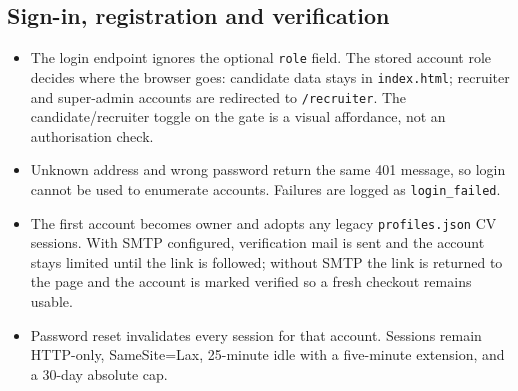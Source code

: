 \documentclass[11pt,a4paper]{article}
\newcommand{\file}[1]{\texttt{\small #1}}
\newcommand{\code}[1]{\texttt{#1}}
\begin{document}
\subsection{Sign-in, registration and verification}
\begin{itemize}[leftmargin=2em]
  \item The login endpoint ignores the optional \code{role} field. The stored
        account role decides where the browser goes: candidate data stays in
        \file{index.html}; recruiter and super-admin accounts are redirected to
        \file{/recruiter}. The candidate/recruiter toggle on the gate is a
        visual affordance, not an authorisation check.
  \item Unknown address and wrong password return the same 401 message, so
        login cannot be used to enumerate accounts. Failures are logged as
        \code{login\_failed}.
  \item The first account becomes owner and adopts any legacy
        \file{profiles.json} CV sessions. With SMTP configured, verification
        mail is sent and the account stays limited until the link is followed;
        without SMTP the link is returned to the page and the account is
        marked verified so a fresh checkout remains usable.
  \item Password reset invalidates every session for that account. Sessions
        remain HTTP-only, SameSite=Lax, 25-minute idle with a five-minute
        extension, and a 30-day absolute cap.
\end{itemize}
\end{document}
